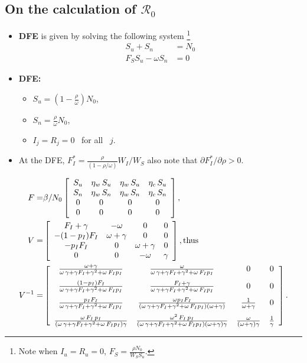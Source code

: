 \documentclass[12pt]{article}
\newcommand{\Rnum}{\mathcal{R}_0}
\theoremstyle{definition} %
\begin{document}
\subsection{On the calculation of $\Rnum$}
\begin{itemize}
\item
{\bf DFE} is given by solving the following system \footnote {Note when $I_u=R_u=0$, $F_S=\frac{\rho N_0}{W_S S_u}$. }
\begin{align*}
S_u+S_n &= N_0 \\
F_S S_u-\omega S_n &= 0
\end{align*}
\item {\bf DFE:}
  \begin{itemize}
    \item[] $S_u = (1-\frac{\rho}{\omega})N_0$,
    \item[] $S_n = \frac{\rho}{\omega} N_0$,
    \item[] $I_j=R_j=0$ \, for all \, $j$.
  \end{itemize}
\item At the DFE, $F_I^* =\frac{\rho }{ (1-\rho/\omega) } W_I/W_S$
also note that $\partial{F_I^*}/\partial{\rho}>0.$
\end{itemize}

\begin{align}
\label{FV}
F =& \beta/N_0 \left[ \begin {array}{cccc}
S_u&\eta_w\,S_u&\eta_w\,S_u&\eta_c\,S_u\\
S_n&\eta_w\,S_n&\eta_w\,S_n&\eta_c\,S_n\\
0&0&0&0\\
0&0&0&0
 \end {array} \right], \\
  V =&
 \left[ \begin {array}{cccc}
F_I+\gamma&-\omega&0&0\\
-(1-p_I)F_I&\omega+\gamma&0&0\\
-p_I F_I&0&\omega+\gamma&0\\
0&0&-\omega&\gamma
\end {array} \right], \text{thus}\\
V^{-1} =&
\left[ \begin {array}{cccc}
\frac {\omega+\gamma}{\omega\,\gamma+\gamma F_I+\gamma^2+\omega\, F_I p_I}&\frac {\omega}{\omega\,\gamma+\gamma F_I+\gamma^2+\omega\, F_I p_I}&0&0\\
\noalign{\medskip}
\frac{(1-p_I) F_I}{\omega\,\gamma+\gamma F_I+\gamma^2+\omega\, F_I p_I}&
\frac{F_I+\gamma}{\omega\,\gamma+\gamma F_I+\gamma^2+\omega\, F_I p_I}&0&0\\
\noalign{\medskip}
\frac{p_I F_I}{\omega\,\gamma+\gamma F_I+\gamma^2+\omega\, F_I p_I}&
\frac{\omega p_I F_I}{(\omega\,\gamma+\gamma F_I+\gamma^2+\omega\, F_I p_I)(\omega+\gamma)}& \frac{1}{\omega+\gamma}&0 \\
\noalign{\medskip}
\frac{\omega\,F_I\,p_I}{(\omega\,\gamma+\gamma F_I+\gamma^2+\omega\, F_I p_I) \gamma}&
\frac{\omega^2\,F_I\,p_I}{(\omega\,\gamma+\gamma F_I+\gamma^2+\omega\, F_I p_I)(\omega+\gamma) \gamma}&
\frac{\omega}{(\omega+\gamma) \gamma}&
\frac{1}{\gamma}
\end {array} \right].
\end{align}
\end{document}
